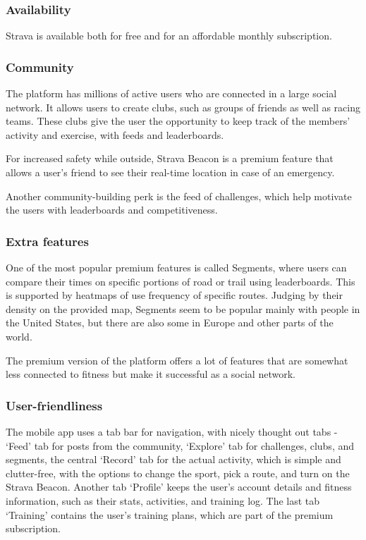 \subsubsection*{Availability}
Strava is available both for free and for an affordable monthly subscription.
\subsubsection*{Community}
The platform has millions of active users who are connected in a large social network.
It allows users to create clubs, such as groups of friends as well as racing teams.
These clubs give the user the opportunity to keep track of the members' activity and exercise, with feeds and leaderboards.

For increased safety while outside, Strava Beacon is a premium feature that allows a user's friend to see their real-time location in case of an emergency.

Another community-building perk is the feed of challenges, which help motivate the users with leaderboards and competitiveness.
\subsubsection*{Extra features}
One of the most popular premium features is called Segments, where users can compare their times on specific portions of road or trail using leaderboards.
This is supported by heatmaps of use frequency of specific routes.
Judging by their density on the provided map, Segments seem to be popular mainly with people in the United States, but there are also some in Europe and other parts of the world.

The premium version of the platform offers a lot of features that are somewhat less connected to fitness but make it successful as a social network.

\subsubsection*{User-friendliness}
The mobile app uses a tab bar for navigation, with nicely thought out tabs - `Feed' tab for posts from the community, `Explore' tab for challenges, clubs, and segments,
the central `Record' tab for the actual activity, which is simple and clutter-free, with the options to change the sport, pick a route, and turn on the Strava Beacon.
Another tab `Profile' keeps the user's account details and fitness information, such as their stats, activities, and training log.
The last tab `Training' contains the user's training plans, which are part of the premium subscription.

